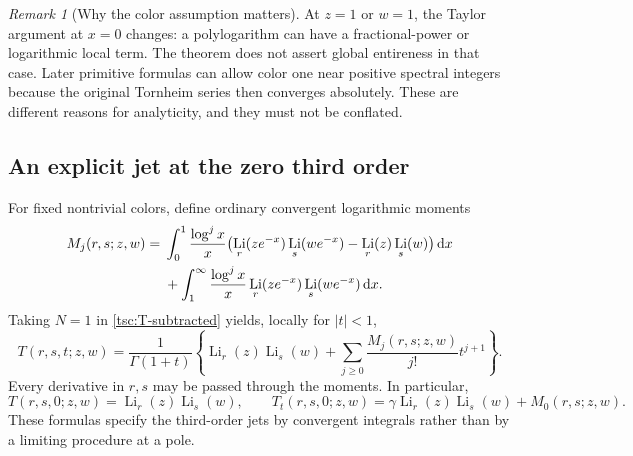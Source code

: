 \documentclass[11pt]{article}
\numberwithin{equation}{section}
\theoremstyle{definition}\newtheorem{definition}[theorem]{Definition}
\theoremstyle{remark}\newtheorem{remark}[theorem]{Remark}
\DeclareMathOperator{\Li}{Li}
\newcommand{\dd}{\,\mathrm d}
\begin{document}
\begin{remark}[Why the color assumption matters]
At $z=1$ or $w=1$, the Taylor argument at $x=0$ changes: a polylogarithm
can have a fractional-power or logarithmic local term. The theorem does
not assert global entireness in that case. Later primitive formulas can
allow color one near positive spectral integers because the original
Tornheim series then converges absolutely. These are different reasons
for analyticity, and they must not be conflated.
\end{remark}

\subsection{An explicit jet at the zero third order}
For fixed nontrivial colors, define ordinary convergent logarithmic moments
\begin{align}\label{tsc:Mmoments}
 M_j(r,s;z,w)={}&\int_0^1\frac{\log^j x}{x}
        \bigl(\Li_r(ze^{-x})\Li_s(we^{-x})-\Li_r(z)\Li_s(w)\bigr)\dd x\notag\\
 &+\int_1^\infty\frac{\log^j x}{x}
                    \Li_r(ze^{-x})\Li_s(we^{-x})\dd x.
\end{align}
Taking $N=1$ in \eqref{tsc:T-subtracted} yields, locally for $|t|<1$,
\begin{equation}\label{tsc:T-zero-jet}
 T(r,s,t;z,w)=\frac1{\Gamma(1+t)}
  \left\{\Li_r(z)\Li_s(w)+
               \sum_{j\ge0}\frac{M_j(r,s;z,w)}{j!}t^{j+1}\right\}.
\end{equation}
Every derivative in $r,s$ may be passed through the moments. In particular,
\[
 T(r,s,0;z,w)=\Li_r(z)\Li_s(w),\qquad
 T_t(r,s,0;z,w)=\gamma\Li_r(z)\Li_s(w)+M_0(r,s;z,w).
\]
These formulas specify the third-order jets by convergent integrals rather
than by a limiting procedure at a pole.
\end{document}
